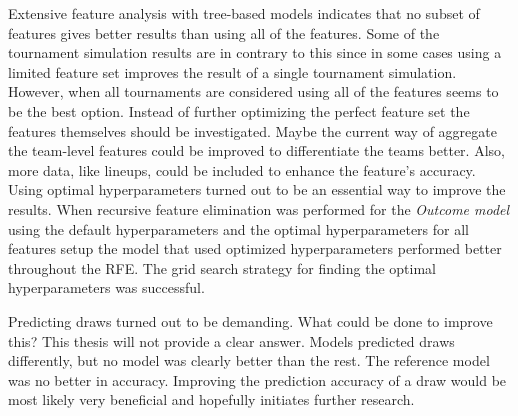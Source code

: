 Extensive feature analysis with tree-based models indicates that no subset of features gives better results than using all of the features. Some of the tournament simulation results are in contrary to this since in some cases using a limited feature set improves the result of a single tournament simulation. However, when all tournaments are considered using all of the features seems to be the best option. Instead of further optimizing the perfect feature set the features themselves should be investigated. Maybe the current way of aggregate the team-level features could be improved to differentiate the teams better. Also, more data, like lineups, could be included to enhance the feature's accuracy. Using optimal hyperparameters turned out to be an essential way to improve the results. When recursive feature elimination was performed for the  \textit{Outcome model} using the default hyperparameters and the optimal hyperparameters for all features setup the model that used optimized hyperparameters performed better throughout the RFE. The grid search strategy for finding the optimal hyperparameters was successful.

Predicting draws turned out to be demanding. What could be done to improve this? This thesis will not provide a clear answer. Models predicted draws differently, but no model was clearly better than the rest. The reference model was no better in accuracy. Improving the prediction accuracy of a draw would be most likely very beneficial and hopefully initiates further research.
